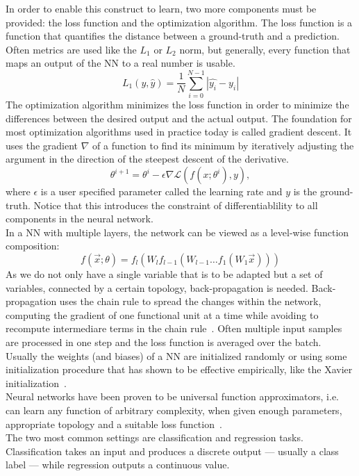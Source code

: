 In order to enable this construct to learn, two more components must be provided: the loss function and the optimization algorithm.
The loss function is a function that quantifies the distance between a ground-truth and a prediction.
Often metrics are used like the $L_1$ or $L_2$ norm, but generally, every function that maps an output of the NN to a real number is usable.
\[ L_1 (y, \hat{y}) = \frac{1}{N} \sum_{i = 0}^{N-1} | \hat{y_i} - y_i | \]
The optimization algorithm minimizes the loss function in order to minimize the differences between the desired output and the actual output.
The foundation for most optimization algorithms used in practice today is called gradient descent.
It uses the gradient $\nabla$ of a function to find its minimum by iteratively adjusting the argument in the direction of the steepest descent of the derivative.
\[ \theta^{i+1} = \theta^i - \epsilon \nabla \mathcal{L}(f(x; \theta^i), y), \]
where $\epsilon$ is a user specified parameter called the learning rate and $y$ is the ground-truth.
Notice that this introduces the constraint of differentiablility to all components in the neural network. \\

In a NN with multiple layers, the network can be viewed as a level-wise function composition:
\[ f(\overrightarrow{x}; \theta) = f_l (W_l f_{l-1}(W_{l-1} \dots f_1(W_1 \overrightarrow{x}))) \]
As we do not only have a single variable that is to be adapted but a set of variables, connected by a certain topology, back-propagation is needed.
Back-propagation uses the chain rule to spread the changes within the network, computing the gradient of one functional unit at a time while avoiding to recompute intermediare terms in the chain rule~\autocite{van_der_malsburg_frank_1986}.
Often multiple input samples are processed in one step and the loss function is averaged over the batch.
Usually the weights (and biases) of a NN are initialized randomly or using some initialization procedure that has shown to be effective empirically, like the Xavier initialization~\autocite{glorot_understanding_2010}. \\

Neural networks have been proven to be universal function approximators, i.e. can learn any function of arbitrary complexity, when given enough parameters, appropriate topology and a suitable loss function~\autocite{sonoda_neural_2017}. \\
The two most common settings are classification and regression tasks.
Classification takes an input and produces a discrete output --- usually a class label --- while regression outputs a continuous value.

